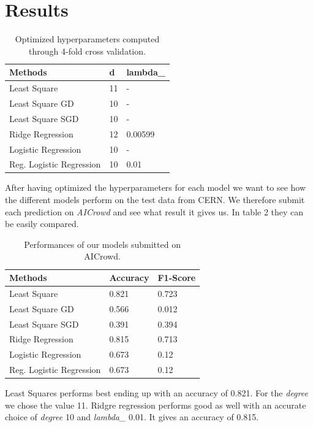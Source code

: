 \documentclass[10pt,conference,compsocconf]{IEEEtran}
\begin{document}
\section{Results}

\begin{table}[htbp]
	\centering
	\begin{tabular}[c]{|l||l|l|}
		\hline
		Methods&d&lambda\_\\
		\hline
		Least Square& 11 &-\\
		Least Square GD& 10 & -\\
		Least Square SGD & 10 &-\\		Ridge Regression&12&0.00599\\
		Logistic Regression & 10&-\\
		Reg. Logistic Regression&10&0.01\\
		\hline
	\end{tabular}
	\caption{Optimized hyperparameters computed\\ through 4-fold cross validation.}
	\label{tab:hyperpam}
\end{table}

After having optimized the hyperparameters for each model we want to see how the different models perform on the test data from CERN. We therefore submit each prediction on \textit{AICrowd} and see what result it gives us. In table 2 they can be easily compared.


\begin{table}[htbp]
	\centering
	\begin{tabular}[c]{|l||l|l|}
		\hline
		Methods&Accuracy&F1-Score\\
		\hline
		Least Square&0.821&0.723\\
		Least Square GD&0.566&0.012\\
		Least Square SGD&0.391&0.394\\		
		Ridge Regression&0.815&0.713\\
		Logistic Regression&0.673&0.12\\
		Reg. Logistic Regression&0.673&0.12\\
		\hline
	\end{tabular}
	\caption{Performances of our models submitted on AICrowd.}
	\label{tab:perform}
\end{table}

Least Squares performs best ending up with an accuracy of 0.821. For the \textit{degree} we chose the value 11. Ridgre regression performs good as well with an accurate choice of \textit{degree} 10 and \textit{lambda\_} 0.01. It gives an accuracy of 0.815.
\end{document}
